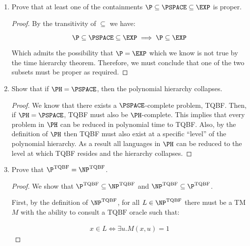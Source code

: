\documentclass[usletter]{article}
\begin{document}
\begin{enumerate}
\begin{proof}
        By assumption $M_{const}(\lfloor M_{\beta} \rfloor) = 1$ if $M_{\beta}$ is a constant time algorithm and $0$ if it isn't.

        Note $M_{\beta}$ halts for all inputs.
      \end{proof}

    \item Prove that at least one of the containments $\P \subseteq \PSPACE \subseteq \EXP$ is proper.

      \begin{proof}
        By the transitivity of $\subseteq$ we have:

        \begin{equation}
          \P \subseteq \PSPACE \subseteq \EXP \implies \P \subseteq \EXP
        \end{equation}

        Which admits the possibility that $\P = \EXP$ which we know is not true by the time hierarchy theorem. Therefore, we must conclude that one of the two subsets must be proper as required.
      \end{proof}

    \item Show that if $\PH = \PSPACE$, then the polynomial hierarchy collapses.

      \begin{proof}
        We know that there exists a $\PSPACE$-complete problem, TQBF. Then, if $\PH = \PSPACE$, TQBF must also be $\PH$-complete. This implies that every problem in $\PH$ can be reduced in polynomial time to TQBF. Also, by the definition of $\PH$ then TQBF must also exist at a specific ``level'' of the polynomial hierarchy. As a result all languages in $\PH$ can be reduced to the level at which TQBF resides and the hierarchy collapses.
      \end{proof}

    \newpage

    \item Prove that $\P^{\text{TQBF}} = \NP^{\text{TQBF}}$.

      \begin{proof}
        We show that $\P^{\text{TQBF}} \subseteq \NP^{\text{TQBF}}$ and $\NP^{\text{TQBF}} \subseteq \P^{\text{TQBF}}$.

        First, by the definition of $\NP^{\text{TQBF}}$, for all $L \in \NP^{\text{TQBF}}$ there must be a TM $M$ with the ability to consult a $\text{TQBF}$ oracle such that:

      \begin{align}
        x \in L \iff \exists u.M(x,u) = 1
      \end{align}


\end{proof}
\end{enumerate}
\end{document}
